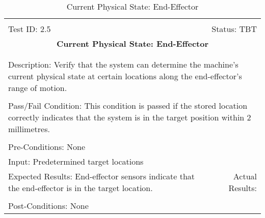 \documentclass[titlepage]{article}
\begin{document}
\begin{center}%
\begin{table}[h!]
\begin{tabular}{|l r|}\hline&\\[-2mm]
	Test ID: 2.5	&Status: TBT\\[-3mm]
	\multicolumn{2}{|c|}{\textbf{\large{Current Physical State: End-Effector}}}\\&\\\hline&\\[-3mm]
	\multicolumn{2}{|p{\textwidth}|}{Description: Verify that the system can determine the machine's current physical state at certain locations along the end-effector's range of motion.}\\[1mm]\hline&\\[-3mm]
	\multicolumn{2}{|p{\textwidth}|}{Pass/Fail Condition: This condition is passed if the stored location correctly indicates that the system is in the target position within 2 millimetres.}\\[1mm]\hline&\\[-3mm]
	\multicolumn{2}{|p{\textwidth}|}{Pre-Conditions: None}\\[4mm]
	\multicolumn{2}{|p{\textwidth}|}{Input: Predetermined target locations}\\[2mm]\hline
	\multicolumn{1}{|p{0.49\textwidth}}{Expected Results: End-effector sensors indicate that the end-effector is in the target location.}	&\multicolumn{1}{|p{0.45\textwidth}|}{Actual Results:}\\\hline&\\[-3mm]
	\multicolumn{2}{|p{\textwidth}|}{Post-Conditions: None}\\\hline
\end{tabular}
\caption{Current Physical State: End-Effector}
\end{table}
\end{center}
\newpage
\end{document}
